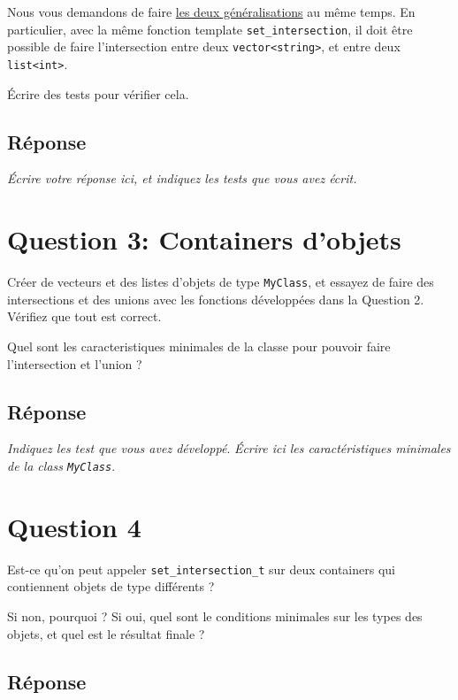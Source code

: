 \documentclass{article}
\begin{document}
Nous vous demandons de faire \uline{les deux généralisations} au même
temps. En particulier, avec la même fonction template
\texttt{set\_intersection}, il doit être possible de faire l'intersection
entre deux \texttt{vector<string>}, et entre deux \texttt{list<int>}. 

Écrire des tests pour vérifier cela. 

\subsection*{Réponse}
\label{sec:org95e3a92}

\emph{Écrire votre réponse ici, et indiquez les tests que vous avez écrit.} 


\section*{Question 3: Containers d'objets}
\label{sec:org4bbbb08}

Créer de vecteurs et des listes d'objets de type \texttt{MyClass}, et
essayez de faire des intersections et des unions avec les fonctions
développées dans la Question 2. Vérifiez que tout est correct.

Quel sont les caracteristiques minimales de la classe pour
pouvoir faire l'intersection et l'union ?

\subsection*{Réponse}
\label{sec:orgdff6ec8}

\emph{Indiquez les test que vous avez développé}.
\emph{Écrire ici les caractéristiques minimales de la class \texttt{MyClass}}.


\section*{Question 4}
\label{sec:orgdc4e9e1}

Est-ce qu'on peut appeler \texttt{set\_intersection\_t} sur deux containers qui
contiennent objets de type différents ? 

Si non, pourquoi ? Si oui, quel sont le conditions minimales
sur les types des objets, et quel est le résultat finale ?


\subsection*{Réponse}
\label{sec:org01f61df}
\end{document}
